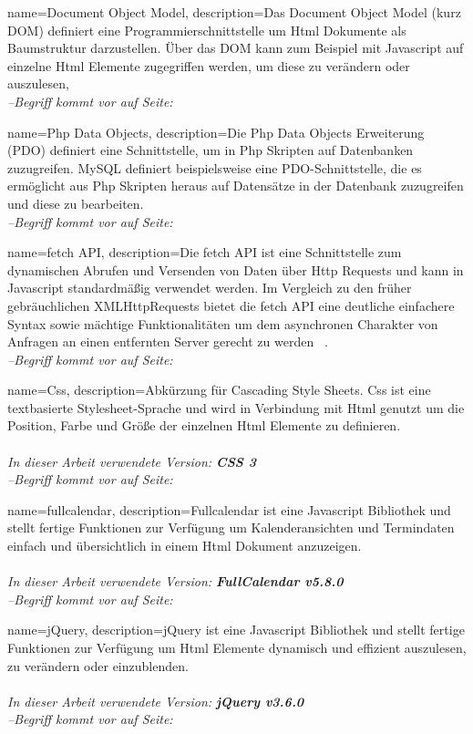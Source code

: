 {
    name=Document Object Model,
    description={Das Document Object Model (kurz DOM) definiert eine Programmierschnittstelle um \gls{Html} Dokumente als Baumstruktur darzustellen. Über das DOM kann zum Beispiel mit \gls{Javascript} auf einzelne Html Elemente zugegriffen werden, um diese zu verändern oder auszulesen,}
    \\\textit{--Begriff kommt vor auf Seite: }
}

{
    name=Php Data Objects,
    description={Die Php Data Objects Erweiterung (PDO) definiert eine Schnittstelle, um in \gls{Php} Skripten auf Datenbanken zuzugreifen. \gls{MySQL} definiert beispielsweise eine PDO-Schnittstelle, die es ermöglicht aus Php Skripten heraus auf Datensätze in der Datenbank zuzugreifen und diese zu bearbeiten.}
    \\\textit{--Begriff kommt vor auf Seite: }
}

{
    name=fetch API,
    description={Die fetch API ist eine Schnittstelle zum dynamischen Abrufen und Versenden von Daten über \gls{Http} Requests und kann in \gls{Javascript} standardmäßig verwendet werden. Im Vergleich zu den früher gebräuchlichen XMLHttpRequests bietet die fetch API eine deutliche einfachere Syntax sowie mächtige Funktionalitäten um dem asynchronen Charakter von Anfragen an einen entfernten Server gerecht zu werden
            ~\cite{fetchAPI}.}
    \\\textit{--Begriff kommt vor auf Seite: }
}

{
    name=Css,
    description={Abkürzung für Cascading Style Sheets. Css ist eine textbasierte Stylesheet-Sprache und wird in Verbindung mit \gls{Html} genutzt um die Position, Farbe und Größe der einzelnen Html Elemente zu definieren.\\ \\
            \textit{In dieser Arbeit verwendete Version: \textbf{CSS 3}}
            ~\cite{Css}}
    \\\textit{--Begriff kommt vor auf Seite: }
}

{
    name=fullcalendar,
    description={Fullcalendar ist eine \gls{Javascript} Bibliothek und stellt fertige Funktionen zur Verfügung um Kalenderansichten und Termindaten einfach und übersichtlich in einem \gls{Html} Dokument anzuzeigen.\\ \\
            \textit{In dieser Arbeit verwendete Version: \textbf{FullCalendar v5.8.0}}
            ~\cite{fullCalendarWeb}}
    \\\textit{--Begriff kommt vor auf Seite: }
}

{
    name=jQuery,
    description={jQuery ist eine \gls{Javascript} Bibliothek und stellt fertige Funktionen zur Verfügung um \gls{Html} Elemente dynamisch und effizient auszulesen, zu verändern oder einzublenden.\\ \\
            \textit{In dieser Arbeit verwendete Version: \textbf{jQuery v3.6.0}}
            ~\cite{jQuery}}
    \\\textit{--Begriff kommt vor auf Seite: }
}